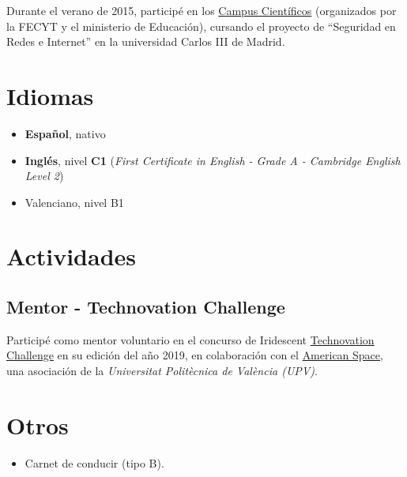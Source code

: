 \documentclass[letterpaper, 12pt, dvipsnames]{article}
\newcommand{\uni}{{\uniFull} ({\uniShort})}
\newcommand{\uniFull}{Universitat Politècnica de València}
\newcommand{\uniShort}{UPV}
\newcommand{\fce}{\emph{First Certificate in English - Grade A - Cambridge English Level 2}}
\begin{document}
Durante el verano de 2015, participé en los \href{https://www.campuscientificos.es/}{Campus Científicos} (organizados por la FECYT y el ministerio de Educación), cursando el proyecto de ``Seguridad en Redes e Internet'' en la universidad Carlos III de Madrid.

\section*{Idiomas}

\begin{itemize}
    \item \textbf{Español}, nativo
    \item \textbf{Inglés}, nivel \textbf{C1} (\fce)
    \item Valenciano, nivel B1
\end{itemize}

\section*{Actividades}

\subsection*{Mentor - Technovation Challenge}

Participé como mentor voluntario en el concurso de Iridescent \href{https://technovationchallenge.org/}{Technovation Challenge} en su edición del año 2019, en colaboración con el \href{https://cdl.upv.es/american-space}{American Space}, una asociación de la \emph{\uni}.

\section*{Otros}

\begin{itemize}
    \item Carnet de conducir (tipo B).
\end{itemize}
\end{document}
